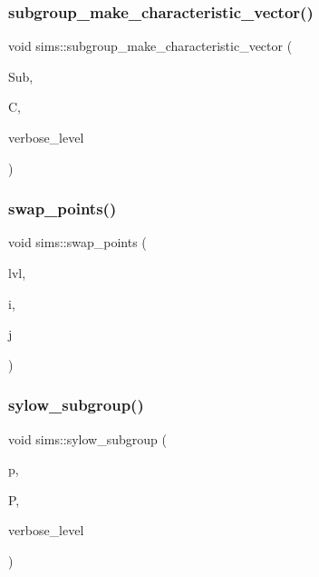 \subsubsection{\texorpdfstring{subgroup\+\_\+make\+\_\+characteristic\+\_\+vector()}{subgroup\_make\_characteristic\_vector()}}
{\footnotesize\ttfamily void sims\+::subgroup\+\_\+make\+\_\+characteristic\+\_\+vector (\begin{DoxyParamCaption}\item[{\mbox{\hyperlink{classsims}{sims}} $\ast$}]{Sub,  }\item[{\mbox{\hyperlink{galois_8h_a09fddde158a3a20bd2dcadb609de11dc}{I\+NT}} $\ast$}]{C,  }\item[{\mbox{\hyperlink{galois_8h_a09fddde158a3a20bd2dcadb609de11dc}{I\+NT}}}]{verbose\+\_\+level }\end{DoxyParamCaption})}

\mbox{\label{classsims_a3443b4bbfb5573864c29b627562819d2}} 
\subsubsection{\texorpdfstring{swap\+\_\+points()}{swap\_points()}}
{\footnotesize\ttfamily void sims\+::swap\+\_\+points (\begin{DoxyParamCaption}\item[{\mbox{\hyperlink{galois_8h_a09fddde158a3a20bd2dcadb609de11dc}{I\+NT}}}]{lvl,  }\item[{\mbox{\hyperlink{galois_8h_a09fddde158a3a20bd2dcadb609de11dc}{I\+NT}}}]{i,  }\item[{\mbox{\hyperlink{galois_8h_a09fddde158a3a20bd2dcadb609de11dc}{I\+NT}}}]{j }\end{DoxyParamCaption})}

\mbox{\label{classsims_addc6f348759a62efab9c5d5b58ad3f61}} 
\subsubsection{\texorpdfstring{sylow\+\_\+subgroup()}{sylow\_subgroup()}}
{\footnotesize\ttfamily void sims\+::sylow\+\_\+subgroup (\begin{DoxyParamCaption}\item[{\mbox{\hyperlink{galois_8h_a09fddde158a3a20bd2dcadb609de11dc}{I\+NT}}}]{p,  }\item[{\mbox{\hyperlink{classsims}{sims}} $\ast$}]{P,  }\item[{\mbox{\hyperlink{galois_8h_a09fddde158a3a20bd2dcadb609de11dc}{I\+NT}}}]{verbose\+\_\+level }\end{DoxyParamCaption})}

